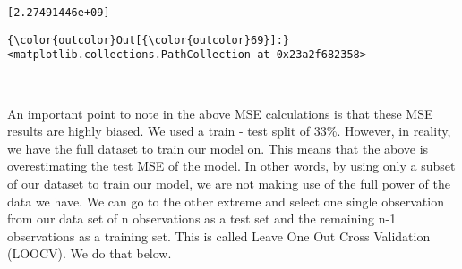 \documentclass[11pt]{article}
\begin{document}
    \begin{Verbatim}[commandchars=\\\{\}]
[2.27491446e+09]

    \end{Verbatim}

\begin{Verbatim}[commandchars=\\\{\}]
{\color{outcolor}Out[{\color{outcolor}69}]:} <matplotlib.collections.PathCollection at 0x23a2f682358>
\end{Verbatim}
            
    \begin{center}
    \end{center}
    { \hspace*{\fill} \\}
    
    An important point to note in the above MSE calculations is that these
MSE results are highly biased. We used a train - test split of 33\%.
However, in reality, we have the full dataset to train our model on.
This means that the above is overestimating the test MSE of the model.
In other words, by using only a subset of our dataset to train our
model, we are not making use of the full power of the data we have. We
can go to the other extreme and select one single observation from our
data set of n observations as a test set and the remaining n-1
observations as a training set. This is called Leave One Out Cross
Validation (LOOCV). We do that below.
\end{document}
